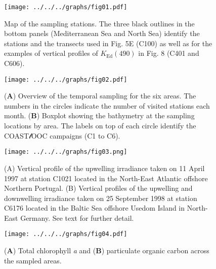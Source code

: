 \documentclass[essd, manuscript]{copernicus}
\begin{document}




\begin{figure}[t]
    \texttt{[image: ../../../graphs/fig01.pdf]}
    \caption{Map of the sampling stations. The three black outlines in the bottom panels (Mediterranean Sea and North Sea) identify the stations and the transects used in Fig. 5E (C100) as well as for the examples of vertical profiles of $K_{\text{Ed}}(490)$ in Fig. 8 (C401 and C606).}
\end{figure}

\clearpage

\begin{figure}[t]
    \texttt{[image: ../../../graphs/fig02.pdf]}
    \caption{(\textbf{A}) Overview of the temporal sampling for the six areas. The numbers in the circles indicate the number of visited stations each month. (\textbf{B}) Boxplot showing the bathymetry at the sampling locations by area. The labels on top of each circle identify the COAST$\mathscr{l}$OOC campaigns (C1 to C6).}
\end{figure}

\clearpage

\begin{figure}[t]
    \texttt{[image: ../../../graphs/fig03.png]}
    \caption{(A) Vertical profile of the upwelling irradiance taken on 11 April 1997 at station C1021 located in the North-East Atlantic offshore Northern Portugal. (B) Vertical profiles of the upwelling and downwelling irradiance taken on 25 September 1998 at station C6176 located in the Baltic Sea offshore Usedom Island in North-East Germany. See text for further detail.}
\end{figure}

\clearpage

\begin{figure}[t]
    \texttt{[image: ../../../graphs/fig04.pdf]}
    \caption{(\textbf{A}) Total chlorophyll \textit{a} and (\textbf{B}) particulate organic carbon across the sampled areas.}
\end{figure}
\end{document}
